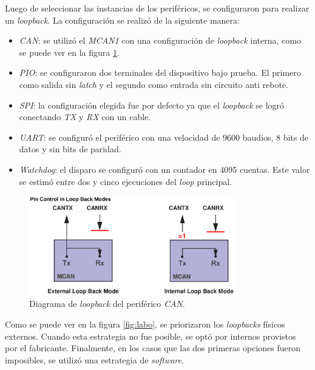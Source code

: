 Luego de seleccionar las instancias de los periféricos, se configuraron para realizar un \emph{loopback}.
La configuración se realizó de la siguiente manera:

\begin{itemize}
    \item \emph{CAN}: se utilizó el \emph{MCAN1} con una configuración de \emph{loopback} interna, como se puede ver en la figura \ref{fig:canloopback}.
    \item \emph{PIO}: se configuraron dos terminales del dispositivo bajo prueba.
        El primero como salida sin \emph{latch} y el segundo como entrada sin circuito anti rebote.
    \item \emph{SPI}: la configuración elegida fue por defecto ya que el \emph{loopback} se logró conectando \emph{TX} y \emph{RX} con un cable.
    \item \emph{UART}: se configuró el periférico con una velocidad de 9600 baudios, 8 bits de datos y sin bits de paridad.
    \item \emph{Watchdog}: el disparo se configuró con un contador en 4095 cuentas.
        Este valor se estimó entre dos y cinco ejecuciones del \emph{loop} principal.
\end{itemize}

\begin{figure}[htbp]
	\centering
	\includegraphics[width=0.8\textwidth]{./Figures/canloopback.png}
    \caption{Diagrama de \emph{loopback} del periférico \emph{CAN}\protect\footnotemark.}
	\label{fig:canloopback}
\end{figure}


Como se puede ver en la figura \ref{fig:labo}, se priorizaron los \emph{loopbacks} físicos externos.
Cuando esta estrategia no fue posible, se optó por internos provistos por el fabricante.
Finalmente, en los casos que las dos primeras opciones fueron imposibles, se utilizó una estrategia de \emph{software}.


